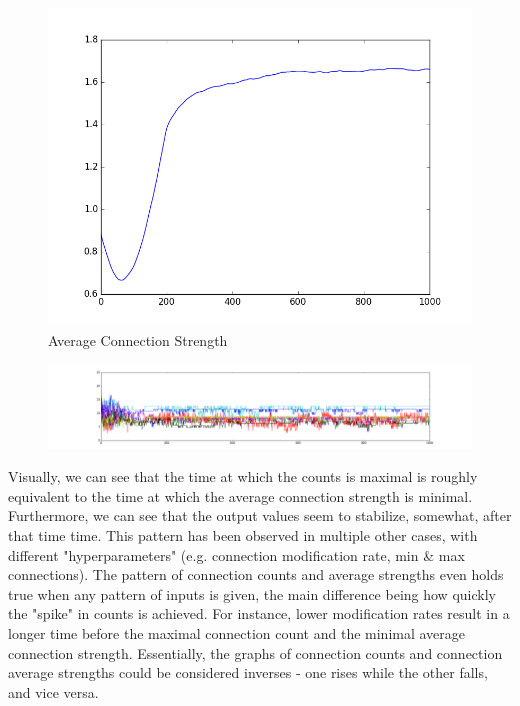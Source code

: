 \documentclass[12pt]{article}
\begin{document}
\begin{figure}[H]
    \includegraphics[width=\linewidth]{../visualizations/strengths_lowrate1000frames.png}
    \caption{Average Connection Strength}
\end{figure}

\begin{figure}[H]
    \includegraphics[width=\linewidth]{../visualizations/lowrate1000frames.png}
\end{figure}

Visually, we can see that the time at which the counts is maximal is roughly equivalent to the time at which the average connection strength is minimal.  Furthermore, we can see that the output values seem to stabilize, somewhat, after that time time.  This pattern has been observed in multiple other cases, with different "hyperparameters" (e.g. connection modification rate, min \& max connections).  The pattern of connection counts and average strengths even holds true when any pattern of inputs is given, the main difference being how quickly the "spike" in counts is achieved.  For instance, lower modification rates result in a longer time before the maximal connection count and the minimal average connection strength.  Essentially, the graphs of connection counts and connection average strengths could be considered inverses - one rises while the other falls, and vice versa.
\end{document}
